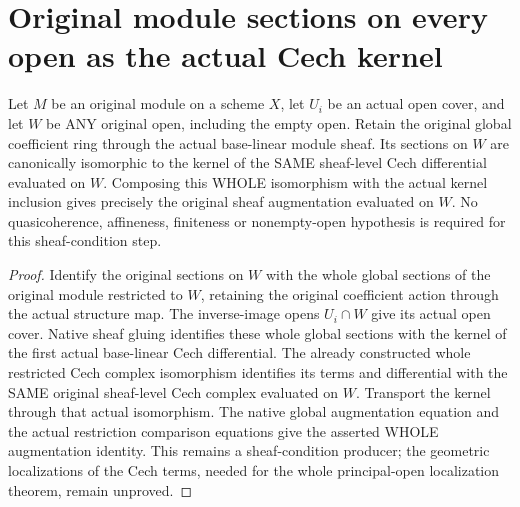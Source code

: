 \section{Original module sections on every open as the actual Cech kernel}

\begin{proposition}
\label{prop:scheme-module-open-sections-kernel}
\leanok
{}
Let $M$ be an original module on a scheme $X$, let $U_i$ be an
actual open cover, and let $W$ be ANY original open, including the
empty open. Retain the original global coefficient ring through
the actual base-linear module sheaf. Its sections on $W$ are
canonically isomorphic to the kernel of the SAME sheaf-level
Cech differential evaluated on $W$. Composing this WHOLE
isomorphism with the actual kernel inclusion gives precisely
the original sheaf augmentation evaluated on $W$.
No quasicoherence, affineness, finiteness or nonempty-open
hypothesis is required for this sheaf-condition step.
\end{proposition}
\begin{proof}
Identify the original sections on $W$ with the whole global
sections of the original module restricted to $W$, retaining
the original coefficient action through the actual structure
map. The inverse-image opens $U_i\cap W$ give its actual open
cover. Native sheaf gluing identifies these whole global
sections with the kernel of the first actual base-linear Cech
differential. The already constructed whole restricted Cech
complex isomorphism identifies its terms and differential with
the SAME original sheaf-level Cech complex evaluated on $W$.
Transport the kernel through that actual isomorphism. The
native global augmentation equation and the actual restriction
comparison equations give the asserted WHOLE augmentation
identity. This remains a sheaf-condition producer; the
geometric localizations of the Cech terms, needed for the
whole principal-open localization theorem, remain unproved.
\end{proof}
